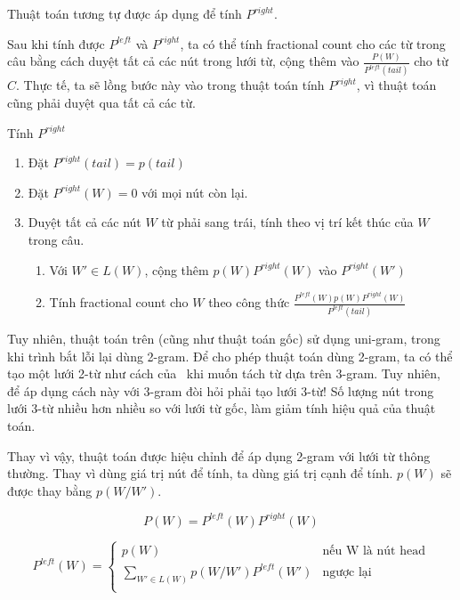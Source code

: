 \documentclass[a4paper,oneside,14pt]{extbook} %
\begin{document}
Thuật toán tương tự được áp dụng để tính $P^{right}$.

Sau khi tính được $P^{left}$ và $P^{right}$, ta có thể tính fractional
count cho các từ trong câu bằng cách duyệt tất cả các nút trong lưới từ,
cộng thêm vào $\displaystyle\frac{P(W)}{P^{left}(tail)}$ cho từ
$C$. Thực tế, ta sẽ lồng bước này vào trong thuật toán tính
$P^{right}$, vì thuật toán cũng phải duyệt qua tất cả các từ.

\begin{algo}\caption{Tính $P^{right}$}
\begin{enumerate}
\item Đặt $P^{right}(tail) = p(tail)$
\item Đặt $P^{right}(W) = 0$ với mọi nút còn lại.
\item Duyệt tất cả các nút $W$ từ phải sang trái, tính theo vị trí kết
  thúc của $W$ trong câu.
  \begin{enumerate}
  \item Với $W' \in L(W)$, cộng thêm $p(W)P^{right}(W)$ vào
    $P^{right}(W')$
  \item Tính fractional count cho $W$ theo công thức
    $\displaystyle\frac{P^{left}(W)p(W)P^{right}(W)}{P^{left}(tail)}$
  \end{enumerate}
\end{enumerate}
\end{algo}


Tuy nhiên, thuật toán trên (cũng như thuật toán gốc) sử dụng
uni-gram, trong khi trình bắt lỗi lại dùng 2-gram. Để cho phép thuật
toán dùng 2-gram, ta có thể tạo một lưới 2-từ như cách của~\cite{Ravishankar} khi muốn tách từ dựa trên 3-gram. Tuy nhiên, để áp
dụng cách này với 3-gram đòi hỏi phải tạo lưới 3-từ! Số lượng nút
trong lưới 3-từ nhiều hơn nhiều so với lưới từ gốc, làm giảm tính hiệu
quả của thuật toán. 

Thay vì vậy, thuật toán được hiệu chỉnh để áp dụng 2-gram với lưới từ
thông thường. Thay vì dùng giá trị nút để tính, ta dùng giá trị cạnh
để tính. $p(W)$ sẽ được thay bằng $p(W/W')$.

$$P(W)=P^{left}(W)P^{right}(W)$$

$$
P^{left}(W) = \left\{
    \begin{array}{ll}
      p(W)&\text{nếu W là nút head}\\
      \displaystyle\sum_{W' \in L(W)}p(W/W')P^{left}(W')&\text{ngược lại}\\
    \end{array}
  \right.
$$
\end{document}
